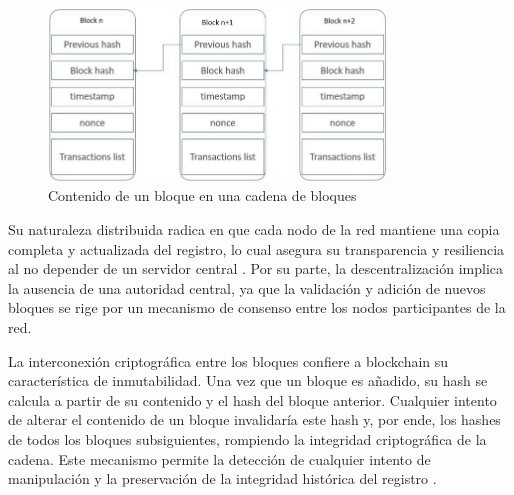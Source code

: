 \begin{figure}[!htpb]
    \centering
    \includegraphics[width=0.8\textwidth]{Figures/blockchain-structure.png}
    \caption{Contenido de un bloque en una cadena de bloques}
    \label{fig:blockchain-structure}
\end{figure}





Su naturaleza distribuida radica en que cada nodo de la red mantiene una copia completa y actualizada del registro, lo cual asegura su transparencia y resiliencia al no depender de un servidor central \cite{bulkowska2023implementation}. Por su parte, la descentralización implica la ausencia de una autoridad central, ya que la validación y adición de nuevos bloques se rige por un mecanismo de consenso entre los nodos participantes de la red. 

La interconexión criptográfica entre los bloques confiere a blockchain su característica de inmutabilidad. Una vez que un bloque es añadido, su hash se calcula a partir de su contenido y el hash del bloque anterior. Cualquier intento de alterar el contenido de un bloque invalidaría este hash y, por ende, los hashes de todos los bloques subsiguientes, rompiendo la integridad criptográfica de la cadena. Este mecanismo permite la detección de cualquier intento de manipulación y la preservación de la integridad histórica del registro \cite{bulkowska2023implementation}.


